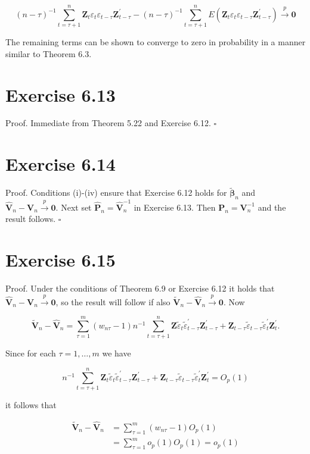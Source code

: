 \documentclass[10pt]{article}
\begin{document}
$$
(n-\tau)^{-1} \sum_{t=\tau+1}^{n} \mathbf{Z}_{t} \varepsilon_{t} \varepsilon_{t-\tau} \mathbf{Z}_{t-\tau}^{\prime}-(n-\tau)^{-1} \sum_{t=\tau+1}^{n} E\left(\mathbf{Z}_{t} \varepsilon_{t} \varepsilon_{t-\tau} \mathbf{Z}_{t-\tau}^{\prime}\right) \xrightarrow{p} \mathbf{0}
$$

The remaining terms can be shown to converge to zero in probability in a manner similar to Theorem 6.3.

\section*{Exercise 6.13}
Proof. Immediate from Theorem 5.22 and Exercise 6.12. \(\square\)

\section*{Exercise 6.14}
Proof. Conditions (i)-(iv) ensure that Exercise 6.12 holds for $\tilde{\boldsymbol{\beta}}_{n}$ and $\hat{\mathbf{V}}_{n}- \mathbf{V}_{n} \xrightarrow{p} \mathbf{0}$. Next set $\hat{\mathbf{P}}_{n}=\hat{\mathbf{V}}_{n}^{-1}$ in Exercise 6.13. Then $\mathbf{P}_{n}=\mathbf{V}_{n}^{-1}$ and the result follows. \(\square\)

\section*{Exercise 6.15}
Proof. Under the conditions of Theorem 6.9 or Exercise 6.12 it holds that $\hat{\mathbf{V}}_{n}-\mathbf{V}_{n} \xrightarrow{p} \mathbf{0}$, so the result will follow if also $\tilde{\mathbf{V}}_{n}-\hat{\mathbf{V}}_{n} \xrightarrow{p} \mathbf{0}$. Now

$$
\tilde{\mathbf{V}}_{n}-\hat{\mathbf{V}}_{n}=\sum_{\tau=1}^{m}\left(w_{n \tau}-1\right) n^{-1} \sum_{t=\tau+1}^{n} \mathbf{Z} \tilde{\varepsilon}_{t} \tilde{\varepsilon}_{t-\tau}^{\prime} \mathbf{Z}_{t-\tau}^{\prime}+\mathbf{Z}_{t-\tau} \tilde{\varepsilon}_{t-\tau} \tilde{\varepsilon}_{t}^{\prime} \mathbf{Z}_{t}^{\prime} .
$$

Since for each $\tau=1, \ldots, m$ we have

$$
n^{-1} \sum_{t=\tau+1}^{n} \mathbf{Z}_{t} \tilde{\varepsilon}_{t} \tilde{\varepsilon}_{t-\tau}^{\prime} \mathbf{Z}_{t-\tau}^{\prime}+\mathbf{Z}_{t-\tau} \tilde{\varepsilon}_{t-\tau} \tilde{\varepsilon}_{t}^{\prime} \mathbf{Z}_{t}^{\prime}=O_{p}(1)
$$

it follows that

$$
\begin{aligned}
\tilde{\mathbf{V}}_{n}-\hat{\mathbf{V}}_{n} & =\sum_{\tau=1}^{m}\left(w_{n \tau}-1\right) O_{p}(1) \\
& =\sum_{\tau=1}^{m} o_{p}(1) O_{p}(1)=o_{p}(1)
\end{aligned}
$$
\end{document}
